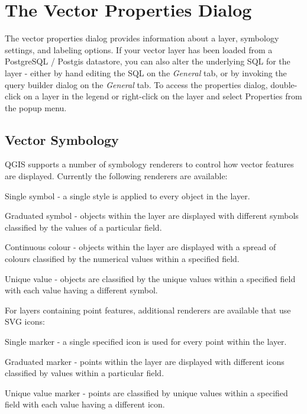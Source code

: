 \section{The Vector Properties
Dialog}\label{sec:vectorprops}
The vector properties dialog provides information about a layer, symbology
settings, and labeling options. If your vector layer has been loaded from a
PostgreSQL / Postgis datastore, you can also alter the underlying SQL for the
layer - either by hand editing the SQL on the \textit{General} tab, or by invoking the
query builder dialog on the \textit{General} tab. To access the properties dialog,
double-click on a layer in the legend or right-click on the layer and select
Properties from the popup menu.

\subsection{Vector Symbology}\label{sec:symbology}

QGIS supports a number of symbology renderers to control how
vector features are displayed. Currently the following renderers
are available:

\begin{compactdesc}
    \item[Single symbol] - a single style is applied to every
    object in the layer.
    \item[Graduated symbol] - objects within the layer are
    displayed with different symbols classified by the values of a
    particular field.
    \item[Continuous colour] - objects within the layer are
    displayed with a spread of colours classified by the numerical
    values within a specified field.
    \item[Unique value] - objects are classified by the unique
    values within a specified field with each value having a
    different symbol.
\end{compactdesc}

For layers containing point features, additional renderers are
available that use SVG icons:

\begin{compactdesc}
    \item[Single marker] - a single specified icon is used for
    every point within the layer.
    \item[Graduated marker] - points within the layer are
    displayed with different icons classified by values within a
    particular field.
    \item[Unique value marker] - points are classified by unique
    values within a specified field with each value having a
    different icon.
\end{compactdesc}

